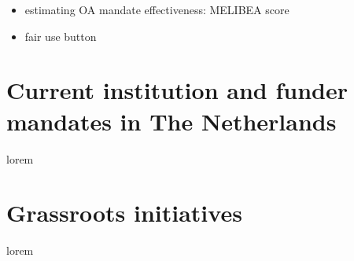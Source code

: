 \documentclass[11pt, openany, oneside, article, a4paper, twocolumn]{memoir}
\begin{document}
\begin{itemize}
  \item estimating OA mandate effectiveness: MELIBEA score \cite{vincent2016estimating}
  \item fair use button \cite{sale2010open}
\end{itemize}

\section{Current institution and funder mandates in The Netherlands}

lorem

\section{Grassroots initiatives}

lorem

\printbibliography

\end{document}
